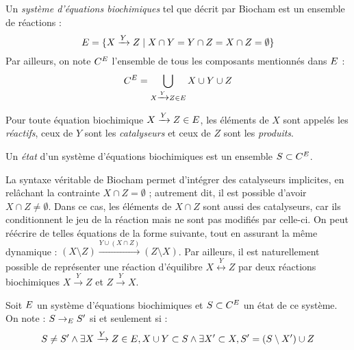 \begin{definition}
  Un \emph{système d'équations biochimiques} tel que décrit par Biocham
  est un ensemble de réactions :
  \[\BCe = \{ X \xrightarrow{Y} Z \mid X \cap Y = Y \cap Z = X \cap Z = \emptyset \}\]
  Par ailleurs, on note $\BCc[\BCe]$
  l'ensemble de tous les composants mentionnés dans $\BCe$ :
  \[\BCc = \bigcup_{X \xrightarrow{Y} Z \in \BCe} X \cup Y \cup Z\]
  
  Pour toute équation biochimique $X \xrightarrow{Y} Z \in \BCe$,
  les éléments de $X$ sont appelés les \emph{réactifs}, ceux de $Y$ sont les \emph{catalyseurs}
  et ceux de $Z$ sont les \emph{produits}.
  
  Un \emph{état} d'un système d'équations biochimiques est un ensemble $S \subset \BCc$.
\end{definition}

\begin{remark}
\label{bc-nondeterminisme}
  La syntaxe véritable de Biocham permet d'intégrer des catalyseurs implicites,
  en relâchant la contrainte $X \cap Z = \emptyset$ ;
  autrement dit, il est possible d'avoir $X \cap Z \neq \emptyset$.
  Dans ce cas, les éléments de $X \cap Z$ sont aussi des catalyseurs,
  car ils conditionnent le jeu de la réaction mais ne sont pas modifiés par celle-ci.
  On peut réécrire de telles équations de la forme suivante,
  tout en assurant la même dynamique :
  $(X \setminus Z) \xrightarrow{Y \cup (X \cap Z)} (Z \setminus X)$.
  Par ailleurs, il est naturellement possible de représenter une réaction d'équilibre
  $X \overset{Y}{\longleftrightarrow} Z$ par deux réactions biochimiques
  $X \xrightarrow{Y} Z$ et $Z \xrightarrow{Y} X$.
\end{remark}

\begin{definition}
  Soit $\BCe$ un système d'équations biochimiques
  et $S \subset \BCc$ un état de ce système.
  On note : $S \BCtrans S'$ si et seulement si :
  \[S \neq S' \wedge
    \exists X \xrightarrow{Y} Z \in \BCe,
    X \cup Y \subset S \wedge
    \exists X' \subset X, S' = (S \setminus X') \cup Z\]
\end{definition}

